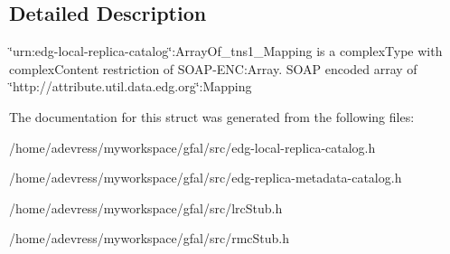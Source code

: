 \subsection{Detailed Description}
\char`\"{}urn:edg-local-replica-catalog\char`\"{}:Array\-Of\_\-tns1\_\-Mapping is a complex\-Type with complex\-Content restriction of SOAP-ENC:Array. SOAP encoded array of \char`\"{}http://attribute.util.data.edg.org\char`\"{}:Mapping 



The documentation for this struct was generated from the following files:\begin{CompactItemize}
\item 
/home/adevress/myworkspace/gfal/src/edg-local-replica-catalog.h\item 
/home/adevress/myworkspace/gfal/src/edg-replica-metadata-catalog.h\item 
/home/adevress/myworkspace/gfal/src/lrc\-Stub.h\item 
/home/adevress/myworkspace/gfal/src/rmc\-Stub.h\end{CompactItemize}

